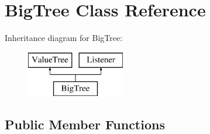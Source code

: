 \hypertarget{class_big_tree}{\section{Big\-Tree Class Reference}
\label{class_big_tree}
}
Inheritance diagram for Big\-Tree\-:\begin{figure}[H]
\begin{center}
\leavevmode
\includegraphics[height=2.000000cm]{class_big_tree}
\end{center}
\end{figure}
\subsection*{Public Member Functions}
